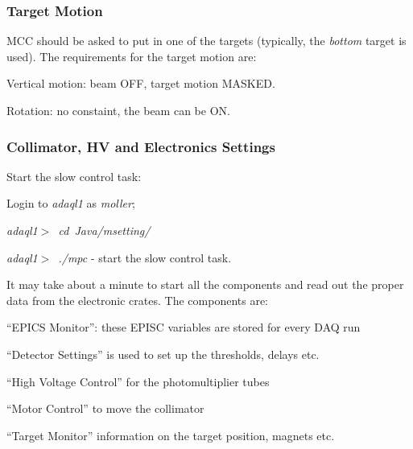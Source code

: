 {\subsubsection {Target Motion}
\label{sec:moller_oper_target}
 MCC should be asked to put in one of the targets (typically, the {\em bottom}
 target is used). The requirements for the target motion are:
 \begin{safetyen}{10}{10}
    \begin{list}{--}{\setlength{\itemsep}{-0.15cm}}
       \item Vertical motion: beam OFF, target motion MASKED.
       \item Rotation: no constaint, the beam can be ON. 
    \end{list}
 \end{safetyen}


\subsubsection {Collimator, HV and  Electronics Settings}
\label{sec:moller_oper_slow}
 Start the slow control task:
 \begin{list}{--}{\setlength{\itemsep}{-0.15cm}}
   \item Login to {\it adaql1} as {\it moller};
   \item {\em adaql1$>$~cd~Java/msetting/}
   \item {\em adaql1$>$~./mpc} - start the slow control task.
 \end{list}
 It may take about a minute to start all the components and read out
 the proper data from the electronic crates.
 The components are: 
 \begin{list}{--}{\setlength{\itemsep}{-0.15cm}}
   \item ``EPICS Monitor'': these EPISC variables are stored for every DAQ run
   \item ``Detector Settings'' is used to set up the thresholds, delays etc.
   \item ``High Voltage Control'' for the photomultiplier tubes
   \item ``Motor Control'' to move the collimator
   \item ``Target Monitor'' information on the target position, magnets etc.
 \end{list}
\infolevtwo{

}}
